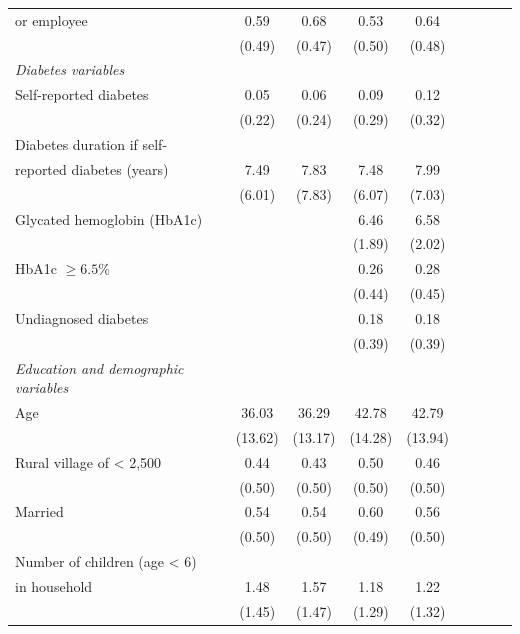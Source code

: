 \begin{table}[p]
\begin{adjustbox}{max width=\linewidth, center}
\begin{threeparttable}
{\begin{tabular}{l*{4}{SS}}
or employee& 0.59&        0.68&        0.53&        0.64\\
                    &      (0.49)&      (0.47)&      (0.50)&      (0.48)\\
\hspace*{10mm}\emph{Diabetes variables} \\
Self-reported diabetes  &         0.05&        0.06&        0.09&        0.12\\
                    &      (0.22)&      (0.24)&      (0.29)&      (0.32)\\
Diabetes duration if self- &&&&\\
reported diabetes (years)   &        7.49&        7.83&        7.48&        7.99\\
                    &      (6.01)&      (7.83)&      (6.07)&      (7.03)\\
Glycated hemoglobin (HbA1c)&            &            &       6.46&        6.58\\
                    &            &            &      (1.89)&      (2.02)\\
HbA1c $\geq 6.5\%$  &            &            &        0.26&        0.28\\
                    &            &            &      (0.44)&      (0.45)\\
Undiagnosed diabetes&            &            &        0.18&        0.18\\
                    &            &            &      (0.39)&      (0.39)\\
\hspace*{10mm}\emph{Education and demographic variables} \\
Age                 &       36.03&       36.29&       42.78&       42.79\\
                    &     (13.62)&     (13.17)&     (14.28)&     (13.94)\\
Rural village of < 2,500&        0.44&        0.43&        0.50&        0.46\\
                    &      (0.50)&      (0.50)&      (0.50)&      (0.50)\\
Married             &        0.54&        0.54&        0.60&        0.56\\
                    &      (0.50)&      (0.50)&      (0.49)&      (0.50)\\
Number of children (age < 6) &&&&\\
in household&        1.48&        1.57&        1.18&        1.22\\
                    &      (1.45)&      (1.47)&      (1.29)&      (1.32)\\

\end{tabular}}
\end{threeparttable}
\end{adjustbox}
\end{table}
